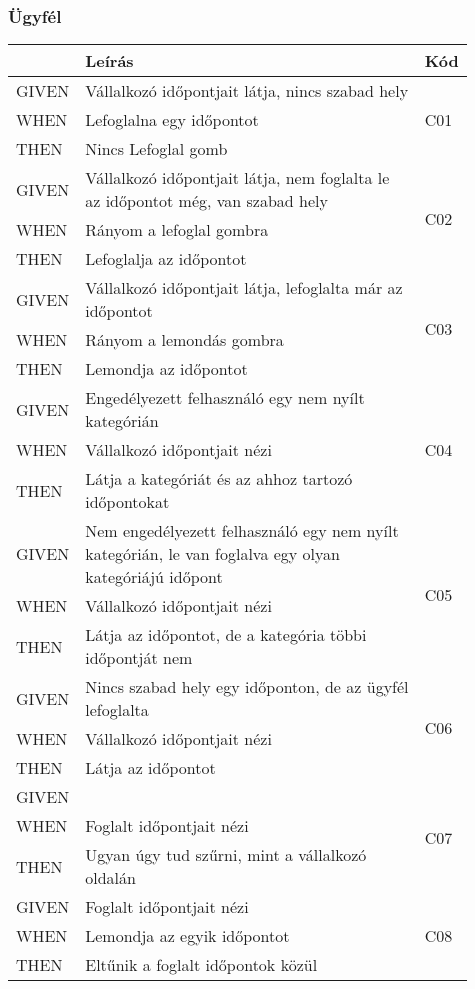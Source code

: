 \subsubsection{Ügyfél}

\begin{table}[H]
	\centering
	\begin{tabular}{|m{0.1\linewidth}|m{0.75\linewidth}|m{0.06\linewidth}|}
		\hline
		& \textbf{Leírás} & \textbf{Kód} \\
		\hline
		GIVEN & Vállalkozó időpontjait látja, nincs szabad hely & \multirow{3}{*}{C01} \\ \cline{1-2}
		WHEN  & Lefoglalna egy időpontot & \\ \cline{1-2}
		THEN  & Nincs Lefoglal gomb & \\ 
		\hline
		GIVEN & Vállalkozó időpontjait látja, nem foglalta le az időpontot még, van szabad hely & \multirow{3}{*}{C02} \\ \cline{1-2}
		WHEN  & Rányom a lefoglal gombra & \\ \cline{1-2}
		THEN  & Lefoglalja az időpontot & \\ 
		\hline
		GIVEN & Vállalkozó időpontjait látja, lefoglalta már az időpontot & \multirow{3}{*}{C03} \\ \cline{1-2}
		WHEN  & Rányom a lemondás gombra & \\ \cline{1-2}
		THEN  & Lemondja az időpontot & \\ 
		\hline
		GIVEN & Engedélyezett felhasználó egy nem nyílt kategórián & \multirow{3}{*}{C04} \\ \cline{1-2}
		WHEN  & Vállalkozó időpontjait nézi & \\ \cline{1-2}
		THEN  & Látja a kategóriát és az ahhoz tartozó időpontokat & \\ 
		\hline
		GIVEN & Nem engedélyezett felhasználó egy nem nyílt kategórián, le van foglalva egy olyan kategóriájú időpont & \multirow{3}{*}{C05} \\ \cline{1-2}
		WHEN  & Vállalkozó időpontjait nézi & \\ \cline{1-2}
		THEN  & Látja az időpontot, de a kategória többi időpontját nem & \\ 
		\hline
		GIVEN & Nincs szabad hely egy időponton, de az ügyfél lefoglalta & \multirow{3}{*}{C06} \\ \cline{1-2}
		WHEN  & Vállalkozó időpontjait nézi & \\ \cline{1-2}
		THEN  & Látja az időpontot & \\ 
		\hline
		GIVEN &  & \multirow{3}{*}{C07} \\ \cline{1-2}
		WHEN  & Foglalt időpontjait nézi & \\ \cline{1-2}
		THEN  & Ugyan úgy tud szűrni, mint a vállalkozó oldalán & \\ 
		\hline
		GIVEN & Foglalt időpontjait nézi & \multirow{3}{*}{C08} \\ \cline{1-2}
		WHEN  & Lemondja az egyik időpontot & \\ \cline{1-2}
		THEN  & Eltűnik a foglalt időpontok közül & \\ 
		\hline
	\end{tabular}
\end{table}


